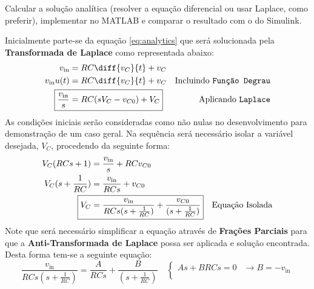 \documentclass{article}
\begin{document}
            \begin{exercise}
                Calcular a solução analítica (resolver a equação diferencial ou usar Laplace, como preferir), implementar no MATLAB e comparar o resultado com o do Simulink.
            \end{exercise}
            \begin{resolution}
                Inicialmente parte-se da equação \ref{eq:analytics} que será solucionada pela \textbf{Transformada de Laplace} como representada abaixo:
                    \begin{align}
                        v_{\text{in}}           &= RC\diff{v_{C}}{t} + v_{C}\nonumber\\
                        v_{\text{in}}u(t)       &= RC\diff{v_{C}}{t} + v_{C} & \text{Incluindo \texttt{Função Degrau}}\nonumber\\
                        \Aboxed{
                            \frac{v_{\text{in}}}{s} &= RC(sV_{C} - v_{C0}) + V_{C}
                        } & \text{Aplicando \texttt{Laplace}}
                    \end{align}
                As condições iniciais serão consideradas como não nulas no desenvolvimento para demonstração de um caso geral. Na sequência será necessário isolar a variável desejada, $V_{C}$, procedendo da seguinte forma:
                    \begin{align}
                        V_{C}(RCs + 1)          &= \frac{v_{\text{in}}}{s} + RCv_{C0}\nonumber\\
                        V_{C}(s + \frac{1}{RC}) &= \frac{v_{\text{in}}}{RCs} + v_{C0}\nonumber\\
                        \Aboxed{
                            V_{C}                   &= \frac{v_{\text{in}}}{RCs(s + \frac{1}{RC})} + \frac{v_{C0}}{(s + \frac{1}{RC})}
                        } & \text{Equação Isolada}
                    \end{align}
                Note que será necessário simplificar a equação através de \textbf{Frações Parciais} para que a \textbf{Anti-Transformada de Laplace} possa ser aplicada e solução encontrada. Desta forma tem-se a seguinte equação:
                    \begin{equation*}
                        \frac{v_{\text{in}}}{RCs(s + \frac{1}{RC})} = 
                        \frac{A}{RCs} + \frac{B}{(s + \frac{1}{RC})}
                        \quad
                        \begin{cases}
                            As + BRCs = 0                & \rightarrow \boxed{B =  -v_{\text{in}}}\\[2.5mm]

\end{cases}
\end{equation*}
\end{resolution}
\end{document}
